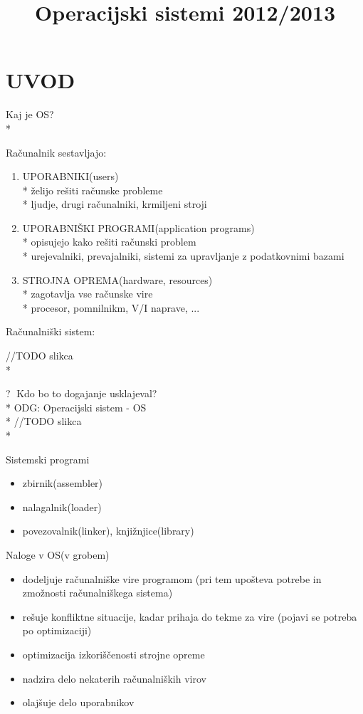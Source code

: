 \documentclass{article}
\title{Operacijski sistemi 2012/2013}
\author{}
\date{}
\begin{document}
\maketitle
\section{UVOD}

Kaj je OS?\\*

Računalnik sestavljajo: 
\begin{enumerate}

\item
UPORABNIKI(users)\\*
želijo rešiti računske probleme\\*
ljudje, drugi računalniki, krmiljeni stroji

\item
UPORABNIŠKI PROGRAMI(application programs)\\*
opisujejo kako rešiti računski problem\\*
urejevalniki, prevajalniki, sistemi za upravljanje z podatkovnimi bazami

\item
STROJNA OPREMA(hardware, resources)\\*
zagotavlja vse računske vire\\*
procesor, pomnilnikm, V/I naprave, ...
\end{enumerate}

Računalniški sistem: 

//TODO slikca\\*

\textcircled{?} Kdo bo to dogajanje usklajeval?\\*
ODG: Operacijski sistem - OS\\*
//TODO slikca\\*

Sistemski programi
\begin{itemize}
  \item zbirnik(assembler)
  \item nalagalnik(loader)
  \item povezovalnik(linker), knjižnjice(library)
\end{itemize}

Naloge v OS(v grobem)
\begin{itemize}
  \item dodeljuje računalniške vire programom (pri tem upošteva potrebe in zmožnosti računalniškega sistema)
  \item rešuje konfliktne situacije, kadar prihaja do tekme za vire (pojavi se potreba po optimizaciji)
  \item optimizacija izkoriščenosti strojne opreme
  \item nadzira delo nekaterih računalniških virov
  \item olajšuje delo uporabnikov
\end{itemize}
\end{document}
